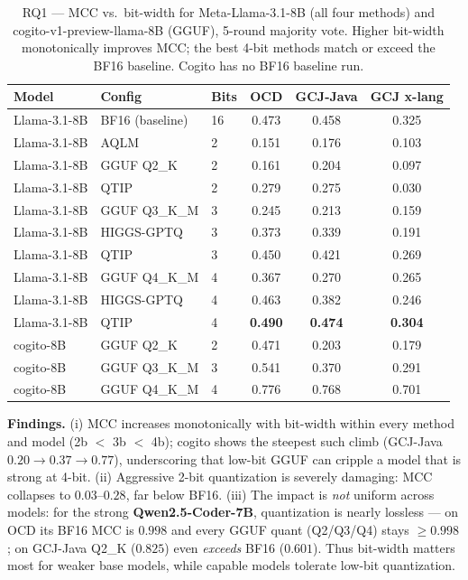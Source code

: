 \documentclass[11pt]{article}
\newcommand{\best}[1]{\textbf{#1}}
\begin{document}
\begin{table}[htbp]
  \centering
  \caption{RQ1 --- MCC vs.\ bit-width for Meta-Llama-3.1-8B (all four methods)
           and cogito-v1-preview-llama-8B (GGUF), 5-round majority vote. Higher
           bit-width monotonically improves MCC; the best 4-bit methods match or
           exceed the BF16 baseline. Cogito has no BF16 baseline run.}
  \label{tab:rq1}
  \small
  \begin{tabular}{lllccc}
    \toprule
    \textbf{Model} & \textbf{Config} & \textbf{Bits} & \textbf{OCD} & \textbf{GCJ-Java} & \textbf{GCJ x-lang} \\
    \midrule
    Llama-3.1-8B & BF16 (baseline)      & 16 & 0.473 & 0.458 & 0.325 \\
    \midrule
    Llama-3.1-8B & AQLM                 & 2  & 0.151 & 0.176 & 0.103 \\
    Llama-3.1-8B & GGUF Q2\_K           & 2  & 0.161 & 0.204 & 0.097 \\
    Llama-3.1-8B & QTIP                 & 2  & 0.279 & 0.275 & 0.030 \\
    \midrule
    Llama-3.1-8B & GGUF Q3\_K\_M        & 3  & 0.245 & 0.213 & 0.159 \\
    Llama-3.1-8B & HIGGS-GPTQ           & 3  & 0.373 & 0.339 & 0.191 \\
    Llama-3.1-8B & QTIP                 & 3  & 0.450 & 0.421 & 0.269 \\
    \midrule
    Llama-3.1-8B & GGUF Q4\_K\_M        & 4  & 0.367 & 0.270 & 0.265 \\
    Llama-3.1-8B & HIGGS-GPTQ           & 4  & 0.463 & 0.382 & 0.246 \\
    Llama-3.1-8B & QTIP                 & 4  & \best{0.490} & \best{0.474} & \best{0.304} \\
    \midrule
    cogito-8B    & GGUF Q2\_K           & 2  & 0.471 & 0.203 & 0.179 \\
    cogito-8B    & GGUF Q3\_K\_M        & 3  & 0.541 & 0.370 & 0.291 \\
    cogito-8B    & GGUF Q4\_K\_M        & 4  & 0.776 & 0.768 & 0.701 \\
    \bottomrule
  \end{tabular}
\end{table}

\noindent\textbf{Findings.} (i) MCC increases monotonically with bit-width
within every method and model (2b $<$ 3b $<$ 4b); cogito shows the steepest such
climb (GCJ-Java $0.20\!\rightarrow\!0.37\!\rightarrow\!0.77$), underscoring that
low-bit GGUF can cripple a model that is strong at 4-bit. (ii) Aggressive 2-bit
quantization is severely damaging: MCC collapses to $0.03$--$0.28$, far below
BF16. (iii) The impact is \emph{not} uniform across models: for the strong
\textbf{Qwen2.5-Coder-7B}, quantization is nearly lossless --- on OCD its BF16
MCC is $0.998$ and every GGUF quant (Q2/Q3/Q4) stays $\ge 0.998$; on GCJ-Java
Q2\_K ($0.825$) even \emph{exceeds} BF16 ($0.601$). Thus bit-width matters most
for weaker base models, while capable models tolerate low-bit quantization.
\end{document}
